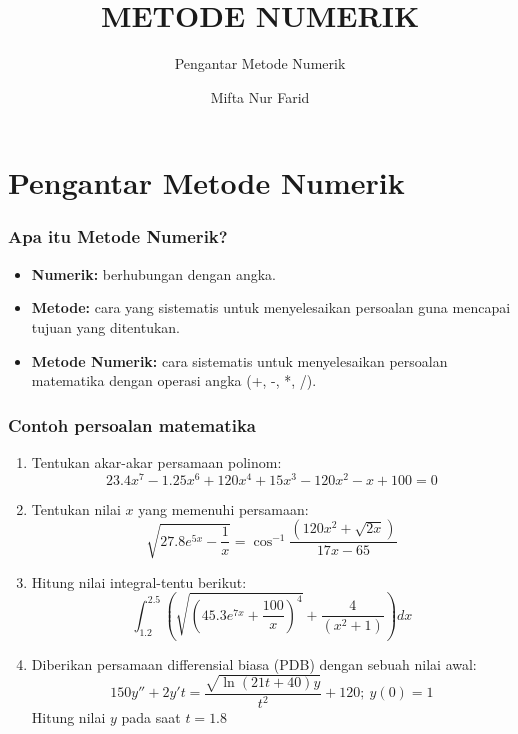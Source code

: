 \documentclass[pdflatex,compress,mathserif]{beamer}
\title{METODE NUMERIK}
\subtitle{Pengantar Metode Numerik}
\author{Mifta Nur Farid}
\begin{document}
\maketitle

\section{Pengantar Metode Numerik}

\begin{frame}
	\frametitle{Apa itu Metode Numerik?}
	\begin{itemize}
		\item \textbf{Numerik:} berhubungan dengan angka.
		\item \textbf{Metode:} cara yang sistematis untuk menyelesaikan persoalan guna mencapai tujuan yang ditentukan.
		\item \textbf{Metode Numerik:} cara sistematis untuk menyelesaikan persoalan matematika dengan operasi angka (+, -, *, /).
	\end{itemize}
\end{frame}

\begin{frame}
	\frametitle{Contoh persoalan matematika}
	\begin{enumerate}
		\item Tentukan akar-akar persamaan polinom:
		\[ 23.4x^7 - 1.25x^6 + 120x^4 + 15x^3 - 120x^2- x + 100 = 0 \]
		\item Tentukan nilai $ x $ yang memenuhi persamaan:
		\[ \sqrt{27.8e^{5x} - \frac{1}{x}} = \cos^{-1}\frac{(120x^2 + \sqrt{2x})}{17x-65}\]
		\item Hitung nilai integral-tentu berikut:
		\[ \int_{1.2}^{2.5} \left( \sqrt{\left(45.3e^{7x}+\frac{100}{x}\right)^4} + \frac{4}{(x^2 + 1)} \right) dx \]
	\end{enumerate}
\end{frame}

\begin{frame}
	\begin{enumerate}
		\setcounter{enumi}{3}
		\item Diberikan persamaan differensial biasa (PDB) dengan sebuah nilai awal:
		\[ 150y'' + 2y't = \frac{\sqrt{\ln(21t+40)y}}{t^2} + 120;~y(0)=1 \]
		Hitung nilai $ y $ pada saat $ t = 1.8 $
	\end{enumerate}
\end{frame}
\end{document}
